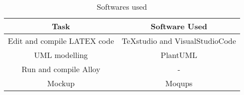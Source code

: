 \begin{flushleft}

\begin{table}[htp]
	\centering

\begin{tabular}{|c|c|}
\hline
Task&Software Used\\
\hline
Edit and compile LATEX code&TeXstudio and VisualStudioCode\\
\hline
UML modelling&PlantUML\\
\hline
Run and compile Alloy&-\\
\hline
Mockup&Moqups\\
\hline

\end{tabular}

\caption{Softwares used} 

\end{table}

\end{flushleft}